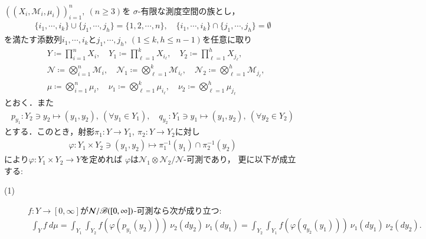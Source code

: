 	\begin{screen}
		\begin{thm}[$n$変数関数のFubiniの定理]
			$\left((X_i,\mathcal{M}_i,\mu_i)\right)_{i=1}^n,\ (n \geq 3)$を
			$\sigma$-有限な測度空間の族とし，
			\begin{align}
				\{i_1,\cdots,i_k\} \cup \{j_1,\cdots,j_h\} = \{1,2,\cdots,n\},
				\quad \{i_1,\cdots,i_k\} \cap \{j_1,\cdots,j_h\} = \emptyset
			\end{align}
			を満たす添数列$i_1, \cdots, i_k$と$j_1, \cdots, j_h,\ (1 \leq k,h \leq n-1)$を任意に取り
			\begin{align}
				&Y \coloneqq \prod_{i=1}^n X_i,
				\quad Y_1 \coloneqq \prod_{\ell=1}^k X_{i_\ell},
				\quad Y_2 \coloneqq \prod_{\ell=1}^h X_{j_\ell}, \\
				&\mathcal{N} \coloneqq \bigotimes_{i=1}^n \mathcal{M}_i,
				\quad \mathcal{N}_1 \coloneqq \bigotimes_{\ell=1}^k \mathcal{M}_{i_\ell},
				\quad \mathcal{N}_2 \coloneqq \bigotimes_{\ell=1}^h \mathcal{M}_{j_\ell}, \\
				&\mu \coloneqq \bigotimes_{i=1}^n \mu_i,
				\quad \nu_1 \coloneqq \bigotimes_{\ell=1}^k \mu_{i_\ell},
				\quad \nu_2 \coloneqq \bigotimes_{\ell=1}^h \mu_{j_\ell}
			\end{align}
			とおく．また
			\begin{align}
				p_{y_1}:Y_2 \ni y_2 \longmapsto (y_1,y_2),\ (\forall y_1 \in Y_1),
				\quad q_{y_2}:Y_1 \ni y_1 \longmapsto (y_1,y_2),\ (\forall y_2 \in Y_2)
			\end{align}
			とする．このとき，射影$\pi_1:Y \longrightarrow Y_1,\ \pi_2:Y \longrightarrow Y_2$に対し
			\begin{align}
				\varphi: Y_1 \times Y_2 \ni (y_1,y_2) \longmapsto \pi_1^{-1}(y_1) \cap \pi_2^{-1}(y_2)
			\end{align}
			により$\varphi:Y_1 \times Y_2 \longrightarrow Y$を定めれば
			$\varphi$は$\mathcal{N}_1 \otimes \mathcal{N}_2/\mathcal{N}$-可測であり，
			更に以下が成立する:
			\begin{description}
				\item[(1)] $f:Y \longrightarrow [0,\infty]$が$\mathcal{N}/\mathscr{B}([0,\infty])$-可測なら次が成り立つ:
					\begin{align}
						\int_Y f\ d\mu
						= \int_{Y_1} \int_{Y_2} f \left(\varphi\left(p_{y_1}(y_2)\right)\right)\ \nu_2(dy_2)\ \nu_1(dy_1)
						= \int_{Y_2} \int_{Y_1} f \left(\varphi\left(q_{y_2}(y_1)\right)\right)\ \nu_1(dy_1)\ \nu_2(dy_2).
					\end{align}
			\end{description}
		\end{thm}
	\end{screen}
	
